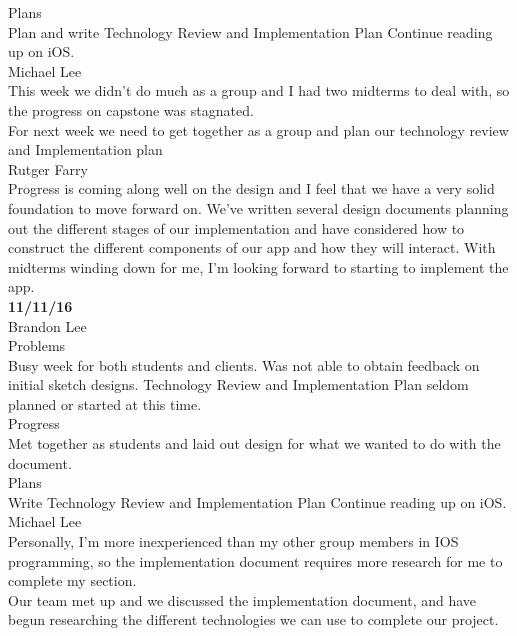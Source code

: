 \documentclass[letterpaper,10pt,titlepage]{article}
\begin{document}
Plans\\
Plan and write Technology Review and Implementation Plan
Continue reading up on iOS.\\

Michael Lee\\

This week we didn't do much as a group and I had two midterms to deal with, so the progress on capstone was stagnated.\\

For next week we need to get together as a group and plan our technology review and Implementation plan\\

Rutger Farry\\

Progress is coming along well on the design and I feel that we have a very solid foundation to move forward on. We've written several design documents planning out the different stages of our implementation and have considered how to construct the different components of our app and how they will interact. With midterms winding down for me, I'm looking forward to starting to implement the app.\\

\textbf{11/11/16}\\

Brandon Lee\\

Problems\\
Busy week for both students and clients. Was not able to obtain feedback on initial sketch designs.
Technology Review and Implementation Plan seldom planned or started at this time.\\

Progress\\
Met together as students and laid out design for what we wanted to do with the document.\\

Plans\\
Write Technology Review and Implementation Plan
Continue reading up on iOS.\\

Michael Lee\\

Personally, I'm more inexperienced than my other group members in IOS programming, so the implementation document requires more research for me to complete my section.\\

Our team met up and we discussed the implementation document, and have begun researching the different technologies we can use to complete our project.\\
\end{document}
